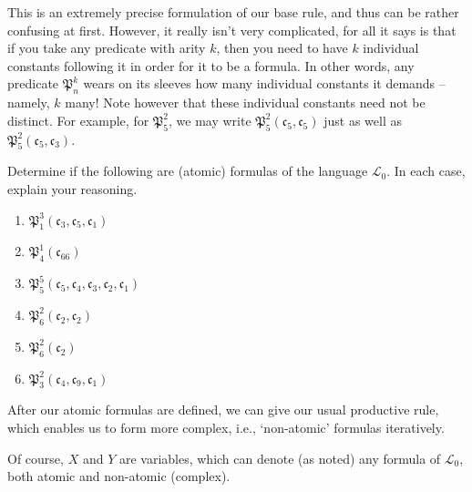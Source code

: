 This is an extremely precise formulation of our base rule, and thus can be rather confusing at first. However, it really isn't very complicated, for all it says is that if you take any predicate with arity $k$, then you need to have $k$ individual constants following it in order for it to be a formula. In other words, any predicate $\mathfrak{P}^k_n$ wears on its sleeves how many individual constants it demands -- namely, $k$ many! Note however that these individual constants need not be distinct. For example, for $\mathfrak{P}^2_5$, we may write $\mathfrak{P}^2_5(\mathfrak{c}_5, \mathfrak{c}_5)$ just as well as $\mathfrak{P}^2_5(\mathfrak{c}_5, \mathfrak{c}_3)$. 

\begin{exc}
Determine if the following are (atomic) formulas of the language $\mathcal{L}_0$. In each case, explain your reasoning. 

\begin{enumerate}
	\item $\mathfrak{P}^3_1(\mathfrak{c}_3, \mathfrak{c}_5, \mathfrak{c}_1)$
	\item $\mathfrak{P}^1_4(\mathfrak{c}_{66})$
	\item $\mathfrak{P}^5_5(\mathfrak{c}_5, \mathfrak{c}_4, \mathfrak{c}_3, \mathfrak{c}_2, \mathfrak{c}_1)$
	\item $\mathfrak{P}^2_6(\mathfrak{c}_2, \mathfrak{c}_2)$
	\item $\mathfrak{P}^2_6(\mathfrak{c}_2)$
	\item $\mathfrak{P}^2_3(\mathfrak{c}_4, \mathfrak{c}_9, \mathfrak{c}_1)$
\end{enumerate}
\end{exc}

After our atomic formulas are defined, we can give our usual productive rule, which enables us to form more complex, i.e., `non-atomic' formulas iteratively. 


Of course, $X$ and $Y$ are variables, which can denote (as noted) any formula of $\mathcal{L}_0$, both atomic and non-atomic (complex).

